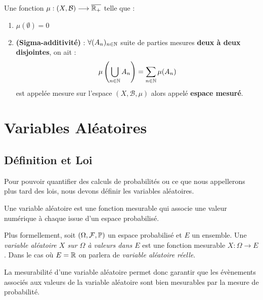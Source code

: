 \begin{remark}
    Une fonction $ \mu : (X, \mathcal{B}) \longrightarrow \overline{\mathbb{R}_+}$ telle que : 
    \begin{enumerate}
        \item $ \mu(\emptyset) = 0 $ 
        \item \textbf{(Sigma-additivité)} : $ \forall (A_n)_{n \in \mathbb{N}}$ suite de parties mesures \textbf{deux à deux disjointes}, on ait : 
            \[ \mu \left( \bigcup_{n \in \mathbb{N}} A_n \right) = \sum_{n \in \mathbb{N}} \mu(A_n) \]
        est appelée mesure sur l'espace $(X, \mathcal{B}, \mu)$ alors appelé \textbf{espace mesuré}. 
    \end{enumerate}
\end{remark}





\section{Variables Aléatoires}

\subsection{Définition et Loi}

Pour pouvoir quantifier des calculs de probabilités ou ce que nous appellerons plus tard des lois, nous devons définir 
les variables aléatoires. 

\begin{definition}
    Une variable aléatoire est une fonction mesurable qui associe une valeur numérique à chaque issue d'un espace probabilisé. 

    \vspace{0.5cm}

    Plus formellement, soit $(\Omega, \mathcal{F}, \mathbb{P})$ un espace probabilisé et $E$ un ensemble. 
    Une \emph{variable aléatoire $X$ sur $\Omega$ à valeurs dans $E$} est une fonction mesurable $X : \Omega \longrightarrow E$. 
    Dans le cas où $E = \mathbb{R}$ on parlera de \emph{variable aléatoire réelle}. 
\end{definition}

La mesurabilité d'une variable aléatoire permet donc garantir que les évènements associés aux valeurs de la variable 
aléatoire sont bien mesurables par la mesure de probabilité. 

